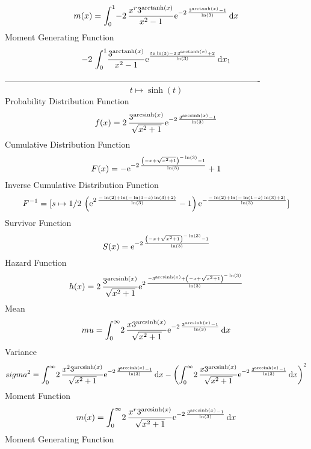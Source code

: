\documentclass[12pt]{article}
\begin{document}
 $$ m(x) = \int_{0}^{1}\!-2\,{\frac {{x}^{r}{3}^{{\rm arctanh} \left(x\right)}}{{
x}^{2}-1}{{\rm e}^{-2\,{\frac {{3}^{{\rm arctanh} \left(x\right)}-1}{
\ln  \left( 3 \right) }}}}}\,{\rm d}x
$$ Moment Generating Function 
 $$-2\,\int_{0}^{1}\!{\frac {{3}^{{\rm arctanh} \left(x\right)}}{{x}^{2}-
1}{{\rm e}^{{\frac {tx\ln  \left( 3 \right) -2\,{3}^{{\rm arctanh} 
\left(x\right)}+2}{\ln  \left( 3 \right) }}}}}\,{\rm d}x_{{1}}
$$-------------------------------------------------------------------------------------------  \\$$t\mapsto \sinh \left( t \right) 
$$Probability Distribution Function 
$$  f(x)=2\,{\frac {{3}^{{\rm arcsinh} \left(x\right)}}{\sqrt {{x}^{2}+1}}{
{\rm e}^{-2\,{\frac {{3}^{{\rm arcsinh} \left(x\right)}-1}{\ln 
 \left( 3 \right) }}}}}
$$Cumulative Distribution Function  
 $$F(x)=-{{\rm e}^{-2\,{\frac { \left( -x+\sqrt {{x}^{2}+1} \right) ^{-\ln 
 \left( 3 \right) }-1}{\ln  \left( 3 \right) }}}}+1
$$ Inverse Cumulative Distribution Function 
  $$F^{-1} = [s\mapsto 1/2\, \left( {{\rm e}^{2\,{\frac {-\ln  \left( 2 \right) +
\ln  \left( -\ln  \left( 1-s \right) \ln  \left( 3 \right) +2 \right) 
}{\ln  \left( 3 \right) }}}}-1 \right) {{\rm e}^{-{\frac {-\ln 
 \left( 2 \right) +\ln  \left( -\ln  \left( 1-s \right) \ln  \left( 3
 \right) +2 \right) }{\ln  \left( 3 \right) }}}}]
$$Survivor Function 
 $$ S(x)={{\rm e}^{-2\,{\frac { \left( -x+\sqrt {{x}^{2}+1} \right) ^{-\ln 
 \left( 3 \right) }-1}{\ln  \left( 3 \right) }}}}
$$ Hazard Function 
 $$ h(x)=2\,{\frac {{3}^{{\rm arcsinh} \left(x\right)}}{\sqrt {{x}^{2}+1}}{
{\rm e}^{2\,{\frac {-{3}^{{\rm arcsinh} \left(x\right)}+ \left( -x+
\sqrt {{x}^{2}+1} \right) ^{-\ln  \left( 3 \right) }}{\ln  \left( 3
 \right) }}}}}
$$Mean 
 $$ mu=\int_{0}^{\infty }\!2\,{\frac {x{3}^{{\rm arcsinh} \left(x\right)}}{
\sqrt {{x}^{2}+1}}{{\rm e}^{-2\,{\frac {{3}^{{\rm arcsinh} \left(x
\right)}-1}{\ln  \left( 3 \right) }}}}}\,{\rm d}x
$$ Variance 
 $$ sigma^2 = \int_{0}^{\infty }\!2\,{\frac {{x}^{2}{3}^{{\rm arcsinh} \left(x
\right)}}{\sqrt {{x}^{2}+1}}{{\rm e}^{-2\,{\frac {{3}^{{\rm arcsinh} 
\left(x\right)}-1}{\ln  \left( 3 \right) }}}}}\,{\rm d}x- \left( \int_
{0}^{\infty }\!2\,{\frac {x{3}^{{\rm arcsinh} \left(x\right)}}{\sqrt {
{x}^{2}+1}}{{\rm e}^{-2\,{\frac {{3}^{{\rm arcsinh} \left(x\right)}-1
}{\ln  \left( 3 \right) }}}}}\,{\rm d}x \right) ^{2}
$$Moment Function 
 $$ m(x) = \int_{0}^{\infty }\!2\,{\frac {{x}^{r}{3}^{{\rm arcsinh} \left(x
\right)}}{\sqrt {{x}^{2}+1}}{{\rm e}^{-2\,{\frac {{3}^{{\rm arcsinh} 
\left(x\right)}-1}{\ln  \left( 3 \right) }}}}}\,{\rm d}x
$$ Moment Generating Function 
\end{document}
